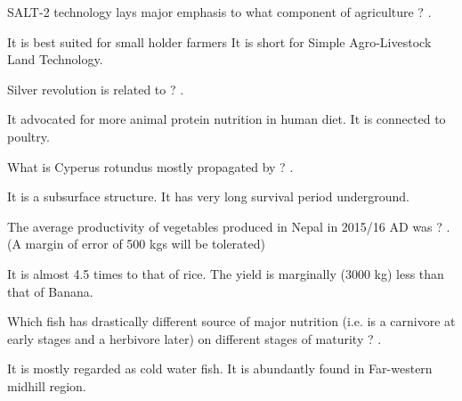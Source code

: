 \documentclass[10pt,a4paper,answers]{exam}
\begin{document}
\begin{questions}
\question SALT-2 technology lays major emphasis to what component of agriculture ? \fillin[Livestock][3cm].
  \begin{solution}
  It is best suited for small holder farmers
  It is short for Simple Agro-Livestock Land Technology.
  \end{solution}

\question Silver revolution is related to ? .
  \begin{solution}
  It advocated for more animal protein nutrition in human diet.
  It is connected to poultry.
  \end{solution}

\question What is Cyperus rotundus mostly propagated by ? \fillin[stolon][3cm].
  \begin{solution}
  It is a subsurface structure.
  It has very long survival period underground.  
  \end{solution}

\question The average productivity of vegetables produced in Nepal in 2015/16 AD was ? \fillin[13992 kg/ha][3cm]. (A margin of error of 500 kgs will be tolerated)
  \begin{solution}
  It is almost 4.5 times to that of rice.
  The yield is marginally (3000 kg) less than that of Banana. 
  \end{solution}

\question Which fish has drastically different source of major nutrition (i.e. is a carnivore at early stages and a herbivore later) on different stages of maturity ? \fillin[Sahar][3cm].
  \begin{solution}
  It is mostly regarded as cold water fish.
  It is abundantly found in Far-western midhill region.
  \end{solution}

\end{questions}
\end{document}
